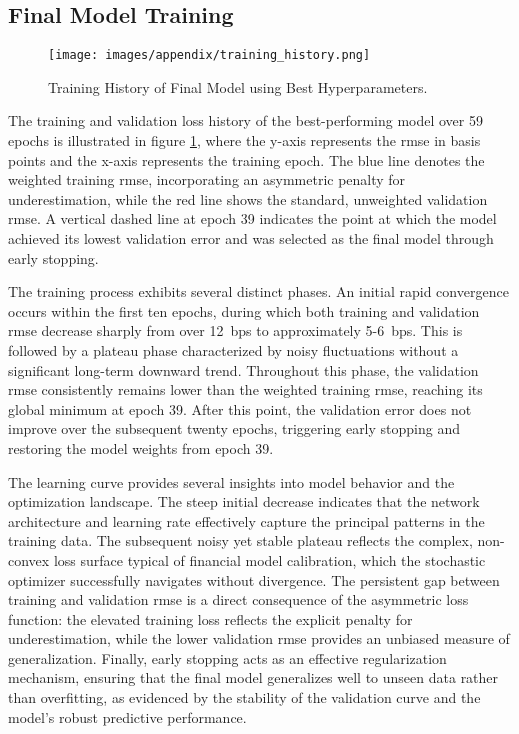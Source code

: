 \subsection{Final Model Training}
\begin{figure}[H]
	\centering
	\texttt{[image: images/appendix/training\_history.png]}
	\caption{Training History of Final Model using Best Hyperparameters.}
	\label{fig:training_history}
\end{figure}
The training and validation loss history of the best-performing model over 59 epochs is illustrated in figure \ref{fig:training_history}, where the y-axis represents the \ac{rmse} in basis points and the x-axis represents the training epoch. The blue line denotes the weighted training \ac{rmse}, incorporating an asymmetric penalty for underestimation, while the red line shows the standard, unweighted validation \ac{rmse}. A vertical dashed line at epoch 39 indicates the point at which the model achieved its lowest validation error and was selected as the final model through early stopping.

The training process exhibits several distinct phases. An initial rapid convergence occurs within the first ten epochs, during which both training and validation \ac{rmse} decrease sharply from over 12~\ac{bps} to approximately 5-6~\ac{bps}. This is followed by a plateau phase characterized by noisy fluctuations without a significant long-term downward trend. Throughout this phase, the validation \ac{rmse} consistently remains lower than the weighted training \ac{rmse}, reaching its global minimum at epoch 39. After this point, the validation error does not improve over the subsequent twenty epochs, triggering early stopping and restoring the model weights from epoch 39.

The learning curve provides several insights into model behavior and the optimization landscape. The steep initial decrease indicates that the network architecture and learning rate effectively capture the principal patterns in the training data. The subsequent noisy yet stable plateau reflects the complex, non-convex loss surface typical of financial model calibration, which the stochastic optimizer successfully navigates without divergence. The persistent gap between training and validation \ac{rmse} is a direct consequence of the asymmetric loss function: the elevated training loss reflects the explicit penalty for underestimation, while the lower validation \ac{rmse} provides an unbiased measure of generalization. Finally, early stopping acts as an effective regularization mechanism, ensuring that the final model generalizes well to unseen data rather than overfitting, as evidenced by the stability of the validation curve and the model's robust predictive performance.

